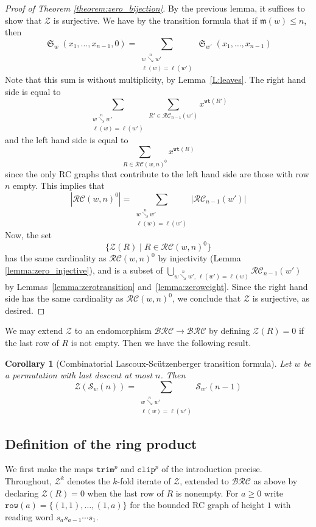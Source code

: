 \documentclass{amsart}
\newtheorem{corollary}[lemma]{Corollary}
\theoremstyle{definition}
\theoremstyle{remark}
\numberwithin{equation}{subsection}
\DeclareMathOperator{\sch}{\mathfrak{S}}
\newcommand{\downvar}[1]{\stackrel{#1}{\searrow}}
\newcommand{\wtt}{\mathtt{wt}}
\newcommand{\trm}{\mathtt{trim}}
\newcommand{\zeromap}{\mathcal{Z}}
\newcommand{\clp}{\mathtt{clip}}
\newcommand{\BRC}{\mathcal{BRC}}
\newcommand{\RC}{\mathcal{RC}}
\newcommand{\maxd}{\mathfrak{m}}
\begin{document}
\begin{proof}[Proof of Theorem \ref{theorem:zero_bijection}]
By the previous lemma, it suffices to show that $\zeromap$ is surjective. We have by the transition formula that if $\maxd(w)\leq n$, then
$$\sch_w(x_1,\ldots,x_{n-1},0) = \sum_{\substack{w\downvar{n} w'\\\ell(w)=\ell(w')}}\sch_{w'}(x_1,\ldots,x_{n-1})$$
Note that this sum is without multiplicity, by Lemma~\ref{L:leaves}. The right hand side is equal to
$$\sum_{\substack{w\downvar{n} w'\\\ell(w)=\ell(w')}}\sum_{R'\in \RC_{n-1}(w')}x^{\wtt(R')}$$
and the left hand side is equal to
$$\sum_{R\in \mathcal{RC}(w, n)^0}x^{\wtt(R)}$$
since the only RC graphs that contribute to the left hand side are those with row $n$ empty. This implies that
$$|\RC(w,n)^0| = \sum_{\substack{w\downvar{n} w'\\\ell(w)=\ell(w')}}|\RC_{n-1}(w')|$$
Now, the set 
$$\{\zeromap(R) \mid R\in \mathcal{RC}(w,n)^0\}$$
has the same cardinality as $\mathcal{RC}(w,n)^0$ by injectivity (Lemma \ref{lemma:zero_injective}), and is a subset of $\bigcup_{w\downvar{n} w',\ \ell(w')=\ell(w)}\mathcal{RC}_{n-1}(w')$ by Lemmas~\ref{lemma:zerotransition} and~\ref{lemma:zeroweight}. Since the right hand side has the same cardinality as $\mathcal{RC}(w,n)^0$, we conclude that $\zeromap$ is surjective, as desired.
\end{proof}


We may extend $\zeromap$ to an endomorphism $\BRC\to\BRC$ by defining $\zeromap(R) = 0$ if the last row of $R$ is not empty. Then we have the following result.

\begin{corollary}[Combinatorial Lascoux-Sc\"utzenberger transition formula]
	Let $w$ be a permutation with last descent at most $n$. Then
	$$\zeromap(\mathcal{S}_w(n))=\sum_{\substack{w\downvar{n} w'\\\ell(w)=\ell(w')}}\mathcal{S}_{w'}(n-1)$$
\end{corollary}





\subsection{Definition of the ring product}\label{section:ringproduct}

We first make the maps $\trm^p$ and $\clp^p$ of the introduction precise. Throughout, $\zeromap^k$ denotes the $k$-fold iterate of $\zeromap$, extended to $\BRC$ as above by declaring $\zeromap(R)=0$ when the last row of $R$ is nonempty. For $a\geq 0$ write $\mathtt{row}(a)=\{(1,1),\ldots,(1,a)\}$ for the bounded RC graph of height $1$ with reading word $s_a s_{a-1}\cdots s_1$.
\end{document}

